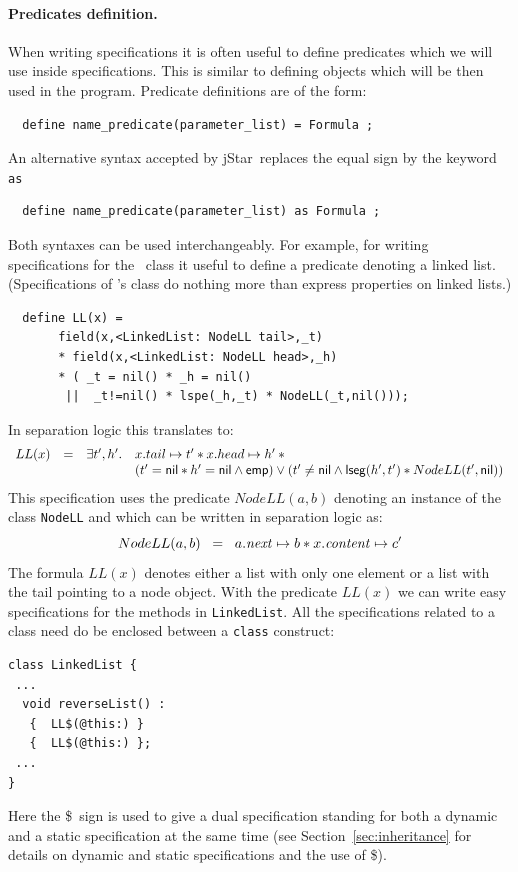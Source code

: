 \documentclass[11pt]{article}
\newcommand{\jStar}{{\sf jStar}}
\newcommand{\psto}{\mapsto}
\newcommand{\emp}{{\sf emp}}
\newcommand{\lseg}{{\sf lseg}}
\newcommand{\nil}{{\sf nil}}
\newcommand{\dollar}{\mbox{\$}}
\begin{document}
\paragraph{Predicates definition.}
When writing specifications it is often useful to define predicates
which we will use inside specifications. This is similar to defining
objects which will be then used in the program. Predicate definitions
are of the form:
\begin{verbatim}
  define name_predicate(parameter_list) = Formula ;
\end{verbatim}
An alternative syntax accepted by \jStar \ replaces the equal sign by the keyword {\tt as}
\begin{verbatim}
  define name_predicate(parameter_list) as Formula ;
\end{verbatim}
Both syntaxes can be used interchangeably.
For example, for writing specifications for the \linkedlist \ class it
useful to define a predicate denoting a linked list. (Specifications of \linkedlist's class do nothing more than express
properties on linked lists.)
\begin{verbatim}
  define LL(x) =  
       field(x,<LinkedList: NodeLL tail>,_t) 
       * field(x,<LinkedList: NodeLL head>,_h) 
       * ( _t = nil() * _h = nil() 
        ||  _t!=nil() * lspe(_h,_t) * NodeLL(_t,nil())); 
\end{verbatim}
%
In separation logic this translates to:
\[\begin{array}{llll}
 LL(x) & = &  \exists t',h' \ldotp  &x.tail \psto t' * x.head \psto h' * {}
\\
& & & (t'=\nil * h'=\nil \wedge \emp ) 
\vee 
(t' \neq \nil \wedge \lseg(h',t') *NodeLL(t',\nil) )  
\end{array}
\]
This specification uses the predicate $NodeLL(a,b)$ denoting an instance of the class {\tt NodeLL}
and which can be written in separation logic as:
\[
  NodeLL(a,b) \;\; = \;\; a.{\it next} \psto b * x.{\it content} \psto c' 
\]
The formula
$LL(x)$ denotes either a list with only one element or a list with
the tail pointing to a node object. With the predicate $LL(x)$ we can
write easy specifications for the methods in {\tt LinkedList}.
All the specifications related to a class need do be enclosed between
a {\tt class} construct:
\begin{verbatim}
class LinkedList {
 ...
  void reverseList() : 
   {  LL$(@this:) } 
   {  LL$(@this:) };
 ...
}
\end{verbatim}
Here the \dollar \ sign is used to give a dual specification standing for both a dynamic and a static specification at the same time (see Section~\ref{sec:inheritance} for details on dynamic and static specifications and the use of \dollar).
\end{document}
